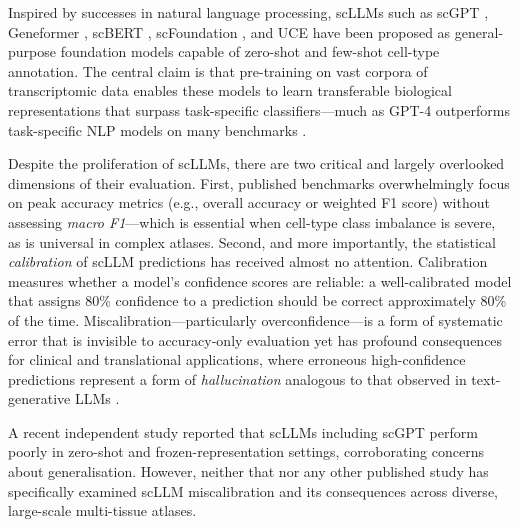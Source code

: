 \documentclass[11pt,a4paper]{article}
\begin{document}
Inspired by successes in natural language processing, scLLMs such as scGPT \citep{Cui2024}, Geneformer \citep{Theodoris2023}, scBERT \citep{Yang2022}, scFoundation \citep{Hao2024}, and UCE \citep{Rosen2023} have been proposed as general-purpose foundation models capable of zero-shot and few-shot cell-type annotation. The central claim is that pre-training on vast corpora of transcriptomic data enables these models to learn transferable biological representations that surpass task-specific classifiers—much as GPT-4 outperforms task-specific NLP models on many benchmarks \citep{Cui2024}.

Despite the proliferation of scLLMs, there are two critical and largely overlooked dimensions of their evaluation. First, published benchmarks overwhelmingly focus on peak accuracy metrics (e.g., overall accuracy or weighted F1 score) without assessing \textit{macro F1}—which is essential when cell-type class imbalance is severe, as is universal in complex atlases. Second, and more importantly, the statistical \textit{calibration} of scLLM predictions has received almost no attention. Calibration measures whether a model's confidence scores are reliable: a well-calibrated model that assigns 80\% confidence to a prediction should be correct approximately 80\% of the time. Miscalibration—particularly overconfidence—is a form of systematic error that is invisible to accuracy-only evaluation yet has profound consequences for clinical and translational applications, where erroneous high-confidence predictions represent a form of \textit{hallucination} analogous to that observed in text-generative LLMs \citep{Guo2017}.

A recent independent study \citep{Kedzierska2025} reported that scLLMs including scGPT perform poorly in zero-shot and frozen-representation settings, corroborating concerns about generalisation. However, neither that nor any other published study has specifically examined scLLM miscalibration and its consequences across diverse, large-scale multi-tissue atlases.
\end{document}
